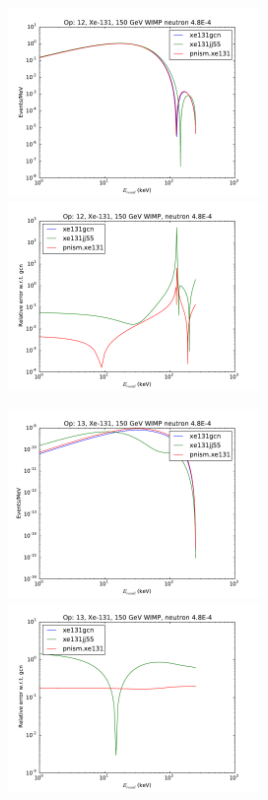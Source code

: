 \documentclass{article}
\begin{document}
\includegraphics[width=0.5\textwidth]{xe131-o12}
\includegraphics[width=0.5\textwidth]{xe131-o12-relerr}

\includegraphics[width=0.5\textwidth]{xe131-o13}
\includegraphics[width=0.5\textwidth]{xe131-o13-relerr}
\end{document}
